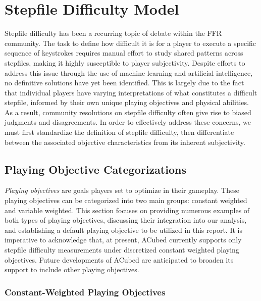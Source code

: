 \section{Stepfile Difficulty Model}
\label{sec:stepfile_difficulty}

Stepfile difficulty has been a recurring topic of debate within the FFR community. The task to define how difficult it is for a player to execute a specific sequence of keystrokes requires manual effort to study shared patterns across stepfiles, making it highly susceptible to player subjectivity. Despite efforts to address this issue through the use of machine learning and artificial intelligence, no definitive solutions have yet been identified. This is largely due to the fact that individual players have varying interpretations of what constitutes a difficult stepfile, informed by their own unique playing objectives and physical abilities. As a result, community resolutions on stepfile difficulty often give rise to biased judgments and disagreements. In order to effectively address these concerns, we must first standardize the definition of stepfile difficulty, then differentiate between the associated objective characteristics from its inherent subjectivity.

\subsection{Playing Objective Categorizations}

\textit{Playing objectives} are goals players set to optimize in their gameplay. These playing objectives can be categorized into two main groups: constant weighted and variable weighted. This section focuses on providing numerous examples of both types of playing objectives, discussing their integration into our analysis, and establishing a default playing objective to be utilized in this report. It is imperative to acknowledge that, at present, ACubed currently supports only stepfile difficulty measurements under discretized constant weighted playing objectives. Future developments of ACubed are anticipated to broaden its support to include other playing objectives.

\subsubsection{Constant-Weighted Playing Objectives}

